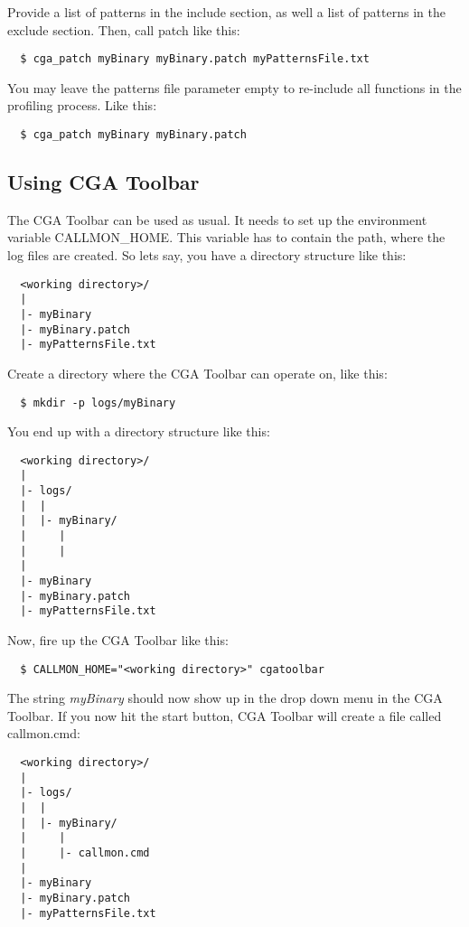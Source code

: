 Provide a list of patterns in the include section, as well a list of patterns in the exclude section. Then, call patch like this:
\begin{verbatim}
  $ cga_patch myBinary myBinary.patch myPatternsFile.txt
\end{verbatim}
You may leave the patterns file parameter empty to re-include all functions in the profiling process. Like this:
\begin{verbatim}
  $ cga_patch myBinary myBinary.patch
\end{verbatim}

\subsection{Using CGA Toolbar} The CGA Toolbar can be used as usual. It needs to set up the environment variable CALLMON\_HOME. This variable has to contain the path, where the log files are created. So lets say, you have a directory structure like this:

\begin{verbatim}
  <working directory>/
  |
  |- myBinary
  |- myBinary.patch
  |- myPatternsFile.txt
\end{verbatim}

Create a directory where the CGA Toolbar can operate on, like this:
\begin{verbatim}
  $ mkdir -p logs/myBinary
\end{verbatim}

You end up with a directory structure like this:
\begin{verbatim}
  <working directory>/
  |
  |- logs/
  |  |
  |  |- myBinary/
  |     |
  |     |
  |
  |- myBinary
  |- myBinary.patch
  |- myPatternsFile.txt
\end{verbatim}

Now, fire up the CGA Toolbar like this:
\begin{verbatim}
  $ CALLMON_HOME="<working directory>" cgatoolbar
\end{verbatim}

The string \emph{myBinary} should now show up in the drop down menu in the CGA Toolbar. If you now hit the start button, CGA Toolbar will create a file called callmon.cmd:
\begin{verbatim}
  <working directory>/
  |
  |- logs/
  |  |
  |  |- myBinary/
  |     |
  |     |- callmon.cmd
  |
  |- myBinary
  |- myBinary.patch
  |- myPatternsFile.txt
\end{verbatim}

